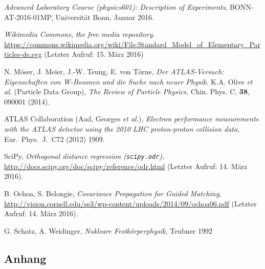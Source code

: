 \documentclass[11pt, a4paper]{article}
\numberwithin{equation}{section}
\begin{document}
\FloatBarrier
\vspace{\fill}
\begin{thebibliography}{19}
	\emph{Advanced Laboratory Course (physics601): Description of Experiments},
	BONN-AT-2016-01MP, Universität Bonn, Januar 2016.

	\emph{Wikimedia Commons, the free media repository}. \url{https://commons.wikimedia.org/wiki/File:Standard_Model_of_Elementary_Particles-de.svg} (Letzter Aufruf: 15. März 2016)
	
	N. Möser, J. Meier, J.-W. Tsung, E. von Törne,
	\emph{Der ATLAS-Versuch: Eigenschaften von W-Bosonen und die Suche nach neuer Physik}.
	K.A. Olive \textit{et al.} (Particle Data Group),
	\emph{The Review of Particle Physics},
	Chin. Phys. C, \textbf{38}, 090001 (2014).

	ATLAS Collaboration (Aad, Georges \textit{et al.}),
	\emph{Electron performance measurements with the ATLAS detector using the 2010 LHC proton-proton collision data},
	Eur.\ Phys.\ J.\ C72 (2012) 1909.

	SciPy,
	\emph{Orthogonal distance regression (\texttt{scipy.odr})},
	\url{http://docs.scipy.org/doc/scipy/reference/odr.html} (Letzter Aufruf: 14. März 2016).

	B. Ochoa, S. Belongie,
	\emph{Covariance Propagation for Guided Matching},
	\url{http://vision.cornell.edu/se3/wp-content/uploads/2014/09/ochoa06.pdf} (Letzter Aufruf: 14. März 2016).
	
	G. Schatz, A. Weidinger, \emph{Nukleare Festkörperphysik}, Teubner 1992
\end{thebibliography}

\begin{appendix}
\newpage
\section{Anhang}


\end{appendix}
\end{document}
